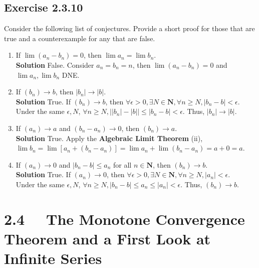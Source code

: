 \documentclass[12pt]{report}
\begin{document}
\subsection*{Exercise 2.3.10}
Consider the following list of conjectures. Provide a short proof for those that are true and a counterexample for any that are false.
\begin{enumerate}[label=(\alph*)]
    \item If $\lim(a_n-b_n)=0$, then $\lim a_n = \lim b_n$.\\
    \textbf{Solution} False. Consider $a_n = b_n = n$, then $\lim (a_n-b_n)=0$ and $\lim a_n, \lim b_n$ DNE.
    \item If $(b_n)\to b$, then $|b_n|\to |b|$.\\
    \textbf{Solution} True. If $(b_n)\to b$, then $\forall \epsilon >0, \exists N \in \mathbf{N}, \forall n \geq N, |b_n-b| < \epsilon$.\\
    Under the same $\epsilon,N$, $\forall n \geq N, \big| |b_n|-|b| \big| \leq |b_n-b|<\epsilon$. Thus, $|b_n|\to |b|$.
    \item If $(a_n) \to a$ and $(b_n-a_n) \to 0$, then $(b_n)\to a$.\\
    \textbf{Solution} True. Apply the \textbf{Algebraic Limit Theorem} (ii), $\lim b_n = \lim [a_n + (b_n-a_n)] = \lim a_n + \lim (b_n-a_n) = a+0 = a$.
    \item If $(a_n) \to 0$ and $|b_n-b| \leq a_n$ for all $n \in \mathbf{N}$, then $(b_n)\to b$.\\
    \textbf{Solution} True. If $(a_n)\to 0$, then $\forall \epsilon >0, \exists N \in \mathbf{N}, \forall n \geq N, |a_n| < \epsilon$.\\
    Under the same $\epsilon,N$, $\forall n \geq N, |b_n-b|\leq a_n \leq |a_n| <\epsilon$. Thus, $(b_n)\to b$.
\end{enumerate}

\section{2.4 ~~The Monotone Convergence Theorem and a First Look at Infinite Series}
\end{document}
